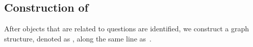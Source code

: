 \subsection{Construction of }
\label{sec-eag-construction}

After objects that are related to questions are identified, we construct a graph structure, denoted as , along the same line as~\cite{peixi2019}. 



